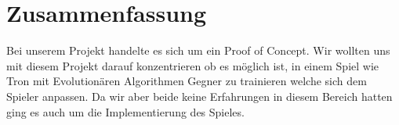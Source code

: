 \section{Zusammenfassung}
Bei unserem Projekt handelte es sich um ein Proof of Concept. Wir wollten uns mit diesem Projekt darauf konzentrieren ob es möglich ist, in einem Spiel wie Tron 
mit Evolutionären Algorithmen Gegner zu trainieren welche sich dem Spieler anpassen. 
Da wir aber beide keine Erfahrungen in diesem Bereich hatten ging es auch um die Implementierung des Spieles. 
